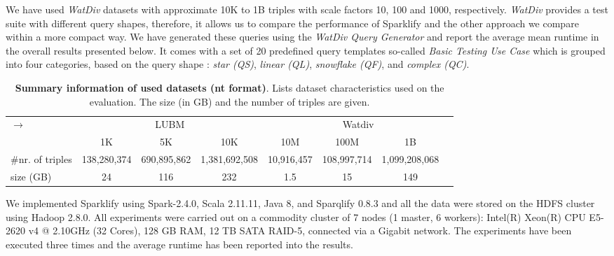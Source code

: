 We have used \textit{WatDiv} datasets with approximate 10K to 1B triples with scale factors 10, 100 and 1000, respectively. 
\textit{WatDiv} provides a test suite with different query shapes, therefore, it allows us to compare the performance of Sparklify and the other approach we compare within a more compact way.
We have generated these queries using the \textit{WatDiv Query Generator} and report the average mean runtime in the overall results presented below.
It comes with a set of 20 predefined query templates so-called \textit{Basic Testing Use Case} which is grouped into four categories, based on the query shape : \textit{star (QS)}, \textit{linear (QL)}, \textit{snowflake (QF)}, and \textit{complex (QC)}.

\begin{table}
\centering
\begin{tabularx}{\textwidth}{Xccccccc}	
\toprule
\multirow{2}{*}{$\longrightarrow$} & \multicolumn{3}{c|}{LUBM} & \multicolumn{4}{c}{Watdiv} \\
\cline{2-8}  \rule{0pt}{10pt}
&   \scriptsize{1K} & \scriptsize{5K} & \scriptsize{10K}  & \scriptsize{10M} &\scriptsize{100M} &\scriptsize{1B} &\\
\midrule
\scriptsize{\#nr. of triples}& \scriptsize{138,280,374} & \scriptsize{690,895,862} & \scriptsize{1,381,692,508} & \scriptsize{10,916,457} & \scriptsize{108,997,714} & \scriptsize{1,099,208,068} &  \\
\scriptsize{size (GB)}  & \scriptsize{24} & \scriptsize{116} & \scriptsize{232} & \scriptsize{1.5} &\scriptsize{15} &\scriptsize{149} &\\
\bottomrule
\end{tabularx}
{\caption{\textbf{Summary information of used datasets (nt format)}.
Lists dataset characteristics used on the evaluation.
The size (in GB) and the number of triples are given.}
\label{tab:sparklify-dataset_info}}
\end{table}

We implemented Sparklify using Spark-2.4.0, Scala 2.11.11, Java 8, and Sparqlify 0.8.3 and all the data were stored on the \gls{HDFS} cluster using Hadoop 2.8.0.
All experiments were carried out on a commodity cluster of 7 nodes (1 master, 6 workers): Intel(R) Xeon(R) CPU E5-2620 v4 @ 2.10GHz (32 Cores), 128 GB RAM, 12 TB SATA RAID-5, connected via a Gigabit network.
The experiments have been executed three times and the average runtime has been reported into the results.

